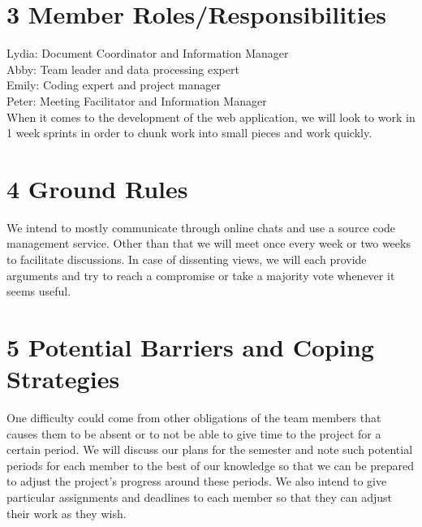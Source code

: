 \documentclass{neu_handout}
\begin{document}
\section*{3 Member Roles/Responsibilities}
Lydia: Document Coordinator and Information Manager \\
Abby: Team leader and data processing expert \\
Emily: Coding expert and project manager \\
Peter: Meeting Facilitator and Information Manager\\

When it comes to the development of the web application, we will look to work in 1 week sprints in order to chunk work into small pieces and work quickly.

\section*{4 Ground Rules}
We intend to mostly communicate through online chats and use a source code management service. Other than that we will meet once every week or two weeks to facilitate discussions. In case of dissenting views, we
will each provide arguments and try to reach a compromise or take a majority vote whenever it seems useful.

\section*{5 Potential Barriers and Coping Strategies}
One difficulty could come from other obligations of the team members that causes them to be absent or to not
be able to give time to the project for a certain period. We will discuss our plans for the semester and note such
potential periods for each member to the best of our knowledge so that we can be prepared to adjust the project’s progress around these periods. We also intend to give particular assignments and deadlines to each member so that they can adjust their work as they wish.
\end{document}
